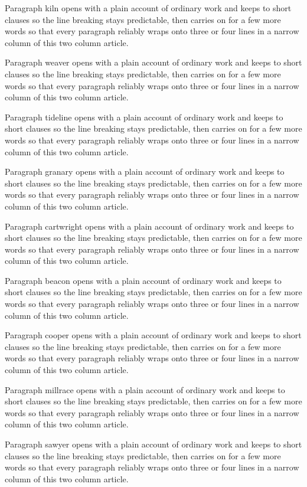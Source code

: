 \documentclass[twocolumn]{article}
\begin{document}
Paragraph kiln opens with a plain account of ordinary work and keeps to short
clauses so the line breaking stays predictable, then carries on for a few more
words so that every paragraph reliably wraps onto three or four lines in a
narrow column of this two column article.

Paragraph weaver opens with a plain account of ordinary work and keeps to short
clauses so the line breaking stays predictable, then carries on for a few more
words so that every paragraph reliably wraps onto three or four lines in a
narrow column of this two column article.

Paragraph tideline opens with a plain account of ordinary work and keeps to short
clauses so the line breaking stays predictable, then carries on for a few more
words so that every paragraph reliably wraps onto three or four lines in a
narrow column of this two column article.

Paragraph granary opens with a plain account of ordinary work and keeps to short
clauses so the line breaking stays predictable, then carries on for a few more
words so that every paragraph reliably wraps onto three or four lines in a
narrow column of this two column article.

Paragraph cartwright opens with a plain account of ordinary work and keeps to short
clauses so the line breaking stays predictable, then carries on for a few more
words so that every paragraph reliably wraps onto three or four lines in a
narrow column of this two column article.

Paragraph beacon opens with a plain account of ordinary work and keeps to short
clauses so the line breaking stays predictable, then carries on for a few more
words so that every paragraph reliably wraps onto three or four lines in a
narrow column of this two column article.

Paragraph cooper opens with a plain account of ordinary work and keeps to short
clauses so the line breaking stays predictable, then carries on for a few more
words so that every paragraph reliably wraps onto three or four lines in a
narrow column of this two column article.

Paragraph millrace opens with a plain account of ordinary work and keeps to short
clauses so the line breaking stays predictable, then carries on for a few more
words so that every paragraph reliably wraps onto three or four lines in a
narrow column of this two column article.

Paragraph sawyer opens with a plain account of ordinary work and keeps to short
clauses so the line breaking stays predictable, then carries on for a few more
words so that every paragraph reliably wraps onto three or four lines in a
narrow column of this two column article.
\end{document}
